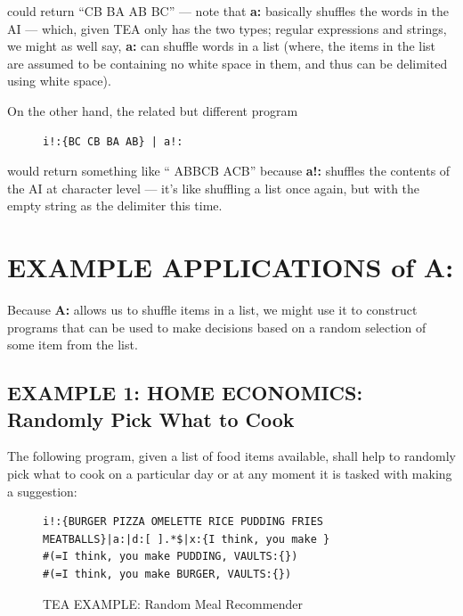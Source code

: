 \documentclass[a4paper, 18pt]{book} %
\begin{document}
could return “CB BA AB BC” --- note that \textbf{a:} basically shuffles the words in the AI --- which, given TEA only has the two types; regular expressions and strings, we might as well say, \textbf{a:} can shuffle words in a list (where, the items in the list are assumed to be containing no white space in them, and thus can be delimited using white space). 

On the other hand, the related but different program


 \begin{figure}[H]
 \Large
  \centering
  \begin{tcolorbox}[teaterminalstyle, title=TEA Program: shuffling a list of symbols]
  \begin{lstlisting}[language=TEA]
i!:{BC CB BA AB} | a!:
   \end{lstlisting}
  \end{tcolorbox}
\end{figure}

would return something like “  ABBCB ACB” because \textbf{a!:} shuffles the contents of the AI at character level --- it's like shuffling a list once again, but with the empty string as the delimiter this time.


\section{EXAMPLE APPLICATIONS of A:}
\label{SECEXAMPA}

Because \textbf{A:} allows us to shuffle items in a list, we might use it to construct programs that can be used to make decisions based on a random selection of some item from the list. 

\subsection{EXAMPLE 1: \textbf{HOME ECONOMICS:} Randomly Pick What to Cook}
\label{SECEXAMP1A}

The following program, given a list of food items available, shall help to randomly pick what to cook on a particular day or at any moment it is tasked with making a suggestion:


 \begin{figure}[H]
 \Large
  \centering
  \begin{tcolorbox}[teaterminalstyle, title=TEA Program: randomly suggest what to cook]
  \begin{lstlisting}[language=TEA]
i!:{BURGER PIZZA OMELETTE RICE PUDDING FRIES 
MEATBALLS}|a:|d:[ ].*$|x:{I think, you make }
#(=I think, you make PUDDING, VAULTS:{})
#(=I think, you make BURGER, VAULTS:{})
   \end{lstlisting}
  \end{tcolorbox}
  \caption{TEA EXAMPLE: Random Meal Recommender}
  \label{FIGA3}
\end{figure}
\end{document}
